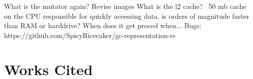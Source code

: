\documentclass[index]{subfiles}
\begin{document}
What is the mutator again?
Revise images
What is the l2 cache?
~50 mb cache on the CPU responsible for quickly accessing data, is orders of magnitude faster than RAM or harddrive?
When does it get proced when...
Bugs: https://github.com/SpicyRicecaker/gc-representation-rs

\section{Works Cited}




\end{document}
